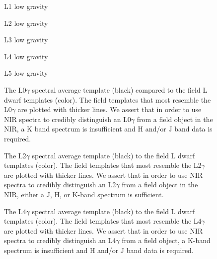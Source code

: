 \documentclass[12pt,preprint]{aastex}
\begin{document}
\begin{figure}
	\caption{L1 low gravity}
	\label{fig:L1lg}
\end{figure}

\begin{figure}
	\caption{L2 low gravity}
	\label{fig:L2lg}
\end{figure}

\begin{figure}
	\caption{L3 low gravity}
	\label{fig:L3lg}
\end{figure}

\begin{figure}
	\caption{L4 low gravity}
	\label{fig:L4lg}
\end{figure}

\begin{figure}
	\caption{L5 low gravity}
	\label{fig:L5lg}
\end{figure}


\begin{figure}
	\caption{The L0$\gamma$ spectral average template (black) compared to the field L dwarf templates (color). The field templates that most resemble the L0$\gamma$ are plotted with thicker lines. We assert that in order to use NIR spectra to credibly distinguish an L0$\gamma$ from a field object in the NIR, a K band spectrum is insufficient and H and/or J band data is required.}
	\label{fig:L0lg-field}
\end{figure}

\begin{figure}
	\caption{The L2$\gamma$ spectral average template (black) to the field L dwarf templates (color). The field templates that most resemble the L2$\gamma$ are plotted with thicker lines. We assert that in order to use NIR spectra to credibly distinguish an L2$\gamma$ from a field object in the NIR, either a J, H, or K-band spectrum is sufficient.}
	\label{fig:L2lg-field}
\end{figure}

\begin{figure}
	\caption{The L4$\gamma$ spectral average template (black) to the field L dwarf templates (color). The field templates that most resemble the L4$\gamma$ are plotted with thicker lines. We assert that in order to use NIR spectra to credibly distinguish an L4$\gamma$ from a field object, a K-band spectrum is insufficient and H and/or J band data is required.}
	\label{fig:L4lg-field}
\end{figure}
\end{document}
